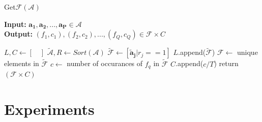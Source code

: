 \documentclass[conference]{IEEEtran}
\begin{document}
\begin{algorithm}
	\caption{ Get$\mathcal{F}$$(\mathcal{A})$ }
	\label{alg:f}
	\hspace*{\algorithmicindent} \textbf{Input: } $ \mathbf{a_1},\mathbf{a_2} ,..., \mathbf{a_P}\in \mathcal{A}$ \\
	\hspace*{\algorithmicindent} \textbf{Output: } $ (f_1,c_1), (f_2, c_2), ..., (f_Q,c_Q) \in \mathcal{F} \times C  $
	\begin{algorithmic}[1] 
		\State $L, C \leftarrow [ \quad ]$ 
		\State $\tilde{\mathcal{A}}, R \leftarrow Sort(\mathcal{A})$
		\State $\tilde{\mathcal{F}} \leftarrow [\mathbf{\tilde{a}_j} | r_j == 1 ]$ 
		\State $L$.append($\tilde{\mathcal{F}}$)
		\EndFor
		\State $\mathcal{F} \leftarrow $ unique elements in $\tilde{\mathcal{F}}$ 
		\State $c \leftarrow$ number of occurances of $f_q$ in $\tilde{\mathcal{F}}$ 
		\State $C$.append($c/T$)
		\EndFor
		\State return $(\mathcal{F} \times C)$
	\end{algorithmic}
\end{algorithm}

\section{Experiments}
\label{sec:exp}
\end{document}
